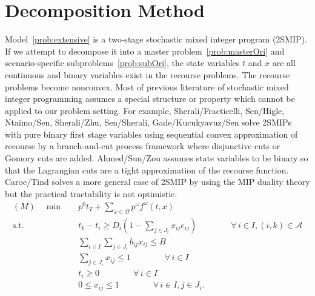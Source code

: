 \documentclass[11pt]{article}
\begin{document}
	\section{Decomposition Method} \label{sec:decomposition}
	Model~\eqref{prob:extensive} is a two-stage stochastic mixed integer program (2SMIP). If we attempt to decompose it into a master problem~\eqref{prob:masterOri} and scenario-specific subproblems~\eqref{prob:subOri}, the state variables \(t\) and \(x\) are all continuous and binary variables exist in the recourse problems. The recourse problems become nonconvex. Most of previous literature of stochastic mixed integer programming assumes a special structure or property which cannot be applied to our problem setting. For example, Sherali/Fracticelli, Sen/Higle, Ntaimo/Sen, Sherali/Zhu, Sen/Sherali, Gade/Kucukyavuz/Sen solve 2SMIPs with pure binary first stage variables using sequential convex approximation of recourse by a branch-and-cut process framework where disjunctive cuts or Gomory cuts are added. Ahmed/Sun/Zou assumes state variables to be binary so that the Lagrangian cuts are a tight approximation of the recourse function. Caroe/Tind solves a more general case of 2SMIP by using the MIP duality theory but the practical tractability is not optimistic. 
	\begin{subequations}
		\label{prob:masterOri}
		\begin{align}
		(M) \quad \min \quad &p^0 t_T + \sum_{\omega \in \Omega} p^\omega f^\omega(t,x)\\
		\text{s.t.} \quad & t_k - t_i \geq D_{i}(1 - \sum_{j \in J_i} x_{ij} e_{ij}) \qquad \qquad \forall \,i \in I, (i,k) \in \mathcal{A} \label{cons:MSep}\\
		& \sum_{i \in I} \sum_{j \in J_i} b_{ij}x_{ij} \leq B  \label{cons:MBudget}\\
		& \sum_{j \in J_i} x_{ij} \leq 1  \qquad \qquad \forall \,i \in I \label{cons:MSingleBudget}\\
		& t_i \geq 0 \qquad \qquad \forall \,i \in I\\
		& 0 \leq x_{ij} \leq 1 \qquad \qquad \forall \,i \in I, j \in J_i.
		\end{align}
	\end{subequations}
\end{document}
